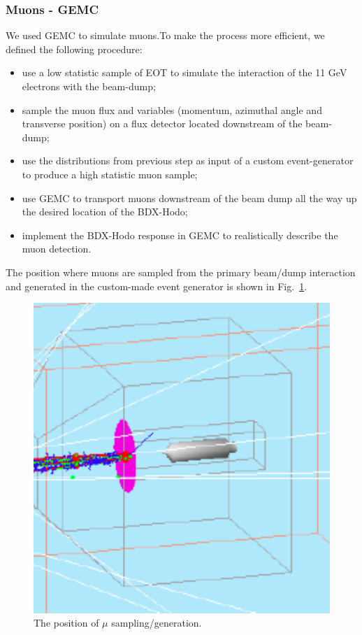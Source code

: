 \subsubsection{Muons - GEMC}
We used GEMC to simulate muons.To make the  process more efficient, we defined  the following  procedure: 
\begin{itemize}
\item  use a low statistic sample of EOT to simulate the interaction of the 11 GeV electrons with the beam-dump;
\item  sample the muon flux and variables (momentum, azimuthal angle and transverse position)  on a flux detector located downstream of the beam-dump;
\item use the distributions from previous step as input of a custom event-generator to produce a high statistic muon sample;
\item use GEMC to transport muons  downstream of the beam dump all the way up the desired location of the BDX-Hodo;
\item  implement the  BDX-Hodo response in GEMC to realistically describe the muon detection.
\end{itemize}
The position where muons are sampled from the primary beam/dump interaction and generated in the custom-made event generator is shown in Fig.~\ref{fig:mu-gen}.

\begin{figure}[h!] 
\center
\includegraphics[width=12cm]{figs/mu-gen.pdf}  
\caption{The position of $\mu$ sampling/generation.}
\label{fig:mu-gen}
\end{figure}



